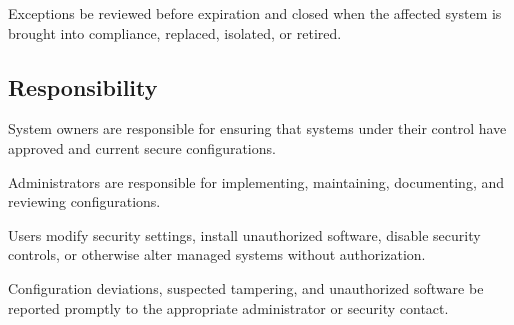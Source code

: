 Exceptions \must{} be reviewed before expiration and closed when the affected system is brought into compliance, replaced, isolated, or retired.

\subsection{Responsibility}

System owners are responsible for ensuring that systems under their control have approved and current secure configurations.

Administrators are responsible for implementing, maintaining, documenting, and reviewing configurations.

Users \mustnot{} modify security settings, install unauthorized software, disable security controls, or otherwise alter managed systems without authorization.

Configuration deviations, suspected tampering, and unauthorized software \must{} be reported promptly to the appropriate administrator or security contact.